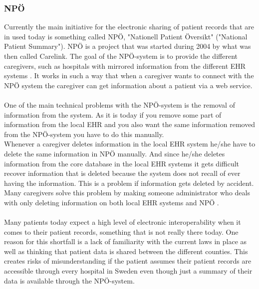 \documentclass[14pt]{article}
\begin{document}
\subsubsection{NPÖ}
Currently the main initiative for the electronic sharing of patient records that are in used today is something called NPÖ, "Nationell Patient Översikt" ("National Patient Summary"). NPÖ is a project that was started during 2004 by what was then called Carelink\cite{ViktorJernelov}. The goal of the NPÖ-system is to provide the different caregivers, such as hospitals with mirrored information from the different \gls{EHR} systems \cite{ViktorJernelov}. It works in such a way that when a caregiver wants to connect with the NPÖ system the caregiver can get information about a patient via a web service. 
\\\\
One of the main technical problems with the NPÖ-system is the removal of information from the system. As it is today if you remove some part of information from the local \gls{EHR} and you also want the same information removed from the NPÖ-system you have to do this manually.
\\ %
Whenever a caregiver deletes information in the local \gls{EHR} system he/she have to delete the same information in NPÖ manually. And since he/she deletes information from the core database in the local \gls{EHR} systems it gets difficult recover information that is deleted because the system does not recall of ever having the information. This is a problem if information gets deleted by accident. Many caregivers solve this problem by making someone administrator who deals with only deleting information on both local \gls{EHR} systems and NPÖ  \cite{ViktorJernelov}.
\\\\
Many patients today expect a high level of electronic \gls{interoperability} when it comes to their patient records\cite{EPJ2}, something that is not really there today. One reason for this shortfall is a lack of familiarity with the current laws in place as well as thinking that patient data is shared between the different counties. This creates risks of misunderstanding if the patient assumes their patient records are accessible through every hospital in Sweden even though just a summary of their data is available through the NPÖ-system.
\end{document}
